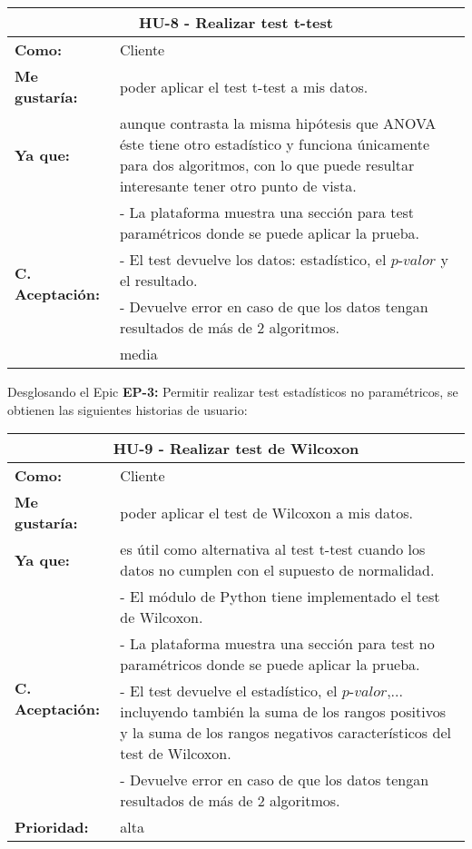 \begin{table}[H]
	\begin{tabular}{| p{3cm}| p{11cm} |}
		\hline
		\multicolumn{2}{|c|}{\textbf{HU-8} - Realizar test t-test} \\ \hline
		\textbf{Como:} & Cliente \\ \hline
		\textbf{Me gustaría:} & poder aplicar el test t-test a mis datos. \\ \hline
		\textbf{Ya que:} & aunque contrasta la misma hipótesis que ANOVA éste tiene otro estadístico y funciona únicamente para dos algoritmos, con lo que puede resultar interesante tener otro punto de vista. \\ \hline
		\multirow{4}{11cm}{\textbf{C. Aceptación:}} & - La plataforma muestra una sección para test paramétricos donde se puede aplicar la prueba. \\
		& - El test devuelve los datos: estadístico, el $\textit{p-valor}$ y el resultado. \\
		& - Devuelve error en caso de que los datos tengan resultados de más de 2 algoritmos. \\ \hline
		\textbf{\textbf{Prioridad:}} & media \\ \hline
	\end{tabular}
\end{table}


\clearpage
Desglosando el Epic \textbf{EP-3:} Permitir realizar test estadísticos no paramétricos, se obtienen las siguientes historias de usuario:

\begin{table}[H]
	\begin{tabular}{| p{3cm}| p{11cm} |}
		\hline
		\multicolumn{2}{|c|}{\textbf{HU-9} - Realizar test de Wilcoxon} \\ \hline
		\textbf{Como:} & Cliente \\ \hline
		\textbf{Me gustaría:} & poder aplicar el test de Wilcoxon a mis datos. \\ \hline
		\textbf{Ya que:} & es útil como alternativa al test t-test cuando los datos no cumplen con el supuesto de normalidad. \\ \hline
		\multirow{4}{11cm}{\textbf{C. Aceptación:}} & - El módulo de Python tiene implementado el test de Wilcoxon. \\
		& - La plataforma muestra una sección para test no paramétricos donde se puede aplicar la prueba. \\
		& - El test devuelve el estadístico, el $\textit{p-valor}$,... incluyendo también la suma de los rangos positivos y la suma de los rangos negativos característicos del test de Wilcoxon. \\
		& - Devuelve error en caso de que los datos tengan resultados de más de 2 algoritmos. \\ \hline
		\textbf{\textbf{Prioridad:}} & alta \\ \hline
	\end{tabular}
\end{table}

